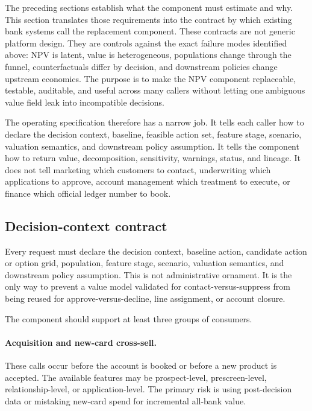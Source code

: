 \documentclass[11pt]{article}
\newcommand{\1}{\mathbf{1}}
\begin{document}
The preceding sections establish what the component must estimate and why.
This section translates those requirements into the contract by which existing
bank systems call the replacement component. These contracts are not generic
platform design. They are controls against the exact failure modes identified
above: NPV is latent, value is heterogeneous, populations change through the
funnel, counterfactuals differ by decision, and downstream policies change
upstream economics. The purpose is to make the NPV component replaceable,
testable, auditable, and useful across many callers without letting one
ambiguous value field leak into incompatible decisions.

The operating specification therefore has a narrow job. It tells each caller
how to declare the decision context, baseline, feasible action set, feature
stage, scenario, valuation semantics, and downstream policy assumption. It
tells the component how to return value, decomposition, sensitivity, warnings,
status, and lineage. It does not tell marketing which customers to contact,
underwriting which applications to approve, account management which treatment
to execute, or finance which official ledger number to book.

\subsection{Decision-context contract}
\label{subsec:decision-context-contract}

Every request must declare the decision context, baseline action, candidate
action or option grid, population, feature stage, scenario, valuation semantics,
and downstream policy assumption. This is not administrative ornament. It is
the only way to prevent a value model validated for contact-versus-suppress
from being reused for approve-versus-decline, line assignment, or account
closure.

The component should support at least three groups of consumers.

\paragraph{Acquisition and new-card cross-sell.}
These calls occur before the account is booked or before a new product is
accepted. The available features may be prospect-level, prescreen-level,
relationship-level, or application-level. The primary risk is using
post-decision data or mistaking new-card spend for incremental all-bank value.
\end{document}
